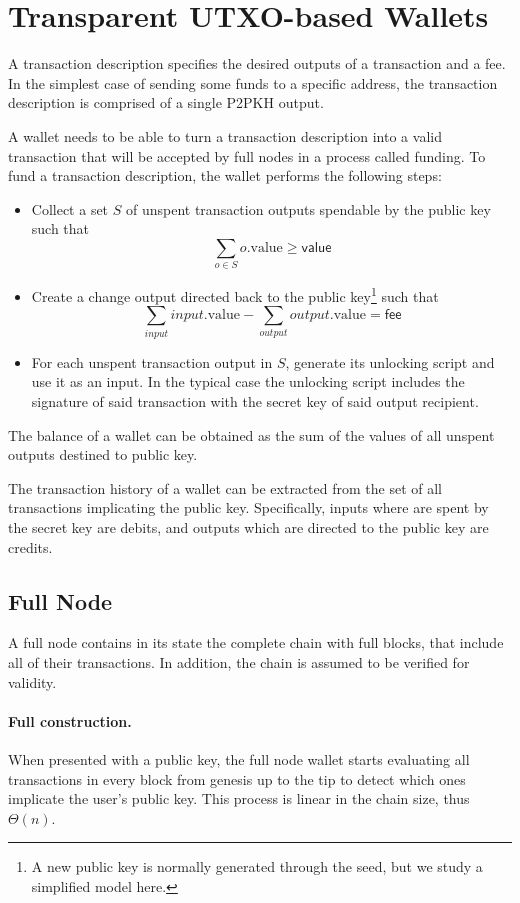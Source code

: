 \section{Transparent UTXO-based Wallets}
\label{transparent-utxo}

A transaction description specifies the desired outputs of a transaction and a fee. In the simplest case of sending some funds to a specific address, the transaction description is comprised of a single P2PKH output.

A wallet needs to be able to turn a transaction description into a valid transaction that will be accepted by full nodes in a process called funding. To fund a transaction description, the wallet performs the following steps:

\begin{itemize}
    \item Collect a set $S$ of unspent transaction outputs spendable by the public key such that $$\sum_{o \in S} o.\text{value} \ge \textsf{value}$$
    \item Create a change output directed back to the public key\footnote{A new public key is normally generated through the seed, but we study a simplified model here.} such that
    $$\sum_{input} input.\text{value} - \sum_{output} output.\text{value} = \textsf{fee}$$
    \item For each unspent transaction output in $S$, generate its unlocking script and use it as an input. In the typical case the unlocking script includes the signature of said transaction with the secret key of said output recipient.
\end{itemize}

The balance of a wallet can be obtained as the sum of the values of all unspent outputs destined to public key.

The transaction history of a wallet can be extracted from the set of all transactions implicating the public key. Specifically, inputs where are spent by the secret key are debits, and outputs which are directed to the public key are credits.

\subsection{Full Node}
A full node contains in its state the complete chain with full blocks, that include all of their transactions. In addition, the chain is assumed to be verified for validity.

\paragraph{Full construction.}
When presented with a public key, the full node wallet starts evaluating all transactions in every block from genesis up to the tip to detect which ones implicate the user's public key. This process is linear in the chain size, thus $\Theta(n)$.

